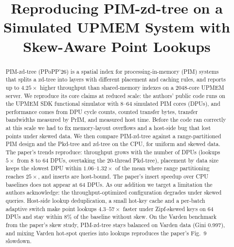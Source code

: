 \documentclass[conference]{IEEEtran}
\begin{document}
\title{Reproducing PIM-zd-tree on a Simulated UPMEM System with Skew-Aware Point Lookups}

\author{
\and
{}
\and
{}
\and
{}
}

\maketitle

\begin{abstract}
PIM-zd-tree (PPoPP'26) is a spatial index for processing-in-memory (PIM) systems that splits a zd-tree into layers
with different placement and caching rules, and reports up to $4.25\times$ higher throughput than shared-memory
indexes on a 2048-core UPMEM server. We reproduce its core claims at reduced scale: the authors' public code runs on
the UPMEM SDK functional simulator with 8--64 simulated PIM cores (DPUs), and performance comes from DPU cycle counts,
counted transfer bytes, transfer bandwidths measured by PrIM, and measured host time. Before the code ran correctly at this scale we had to fix
memory-layout overflows and a host-side bug that lost points under skewed data.
We then compare PIM-zd-tree against a range-partitioned PIM design and the Pkd-tree and zd-tree on the CPU, for
uniform and skewed data. The paper's trends reproduce: throughput grows with the number of DPUs (lookups $5\times$
from 8 to 64 DPUs, overtaking the 20-thread Pkd-tree), placement by data size keeps the slowest DPU within
$1.06$--$1.32\times$ of the mean where range partitioning reaches $25\times$, and inserts are host-bound. The paper's
insert speedup over CPU baselines does not appear at 64 DPUs.
As our addition we target a limitation the authors acknowledge: the throughput-optimized configuration degrades under
skewed queries. Host-side lookup deduplication, a small hot-key cache and a per-batch adaptive switch make point lookups
$4.3$--$57\times$ faster under Zipf-skewed keys on 64 DPUs and stay within 8\% of the baseline without skew. On the
Varden benchmark from the paper's skew study, PIM-zd-tree stays balanced on Varden data (Gini 0.997), and mixing
Varden hot-spot queries into lookups reproduces the paper's Fig.~9 slowdown.
\end{abstract}
\end{document}

